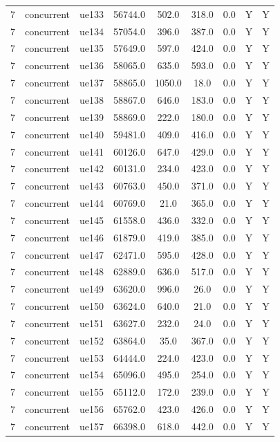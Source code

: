 \begin{table}[ht]
\begin{tabular}{|c|c|c|c|c|c|c|c|c|}
7 & concurrent & ue133 & 56744.0 & 502.0 & 318.0 & 0.0 & Y & Y \\
7 & concurrent & ue134 & 57054.0 & 396.0 & 387.0 & 0.0 & Y & Y \\
7 & concurrent & ue135 & 57649.0 & 597.0 & 424.0 & 0.0 & Y & Y \\
7 & concurrent & ue136 & 58065.0 & 635.0 & 593.0 & 0.0 & Y & Y \\
7 & concurrent & ue137 & 58865.0 & 1050.0 & 18.0 & 0.0 & Y & Y \\
7 & concurrent & ue138 & 58867.0 & 646.0 & 183.0 & 0.0 & Y & Y \\
7 & concurrent & ue139 & 58869.0 & 222.0 & 180.0 & 0.0 & Y & Y \\
7 & concurrent & ue140 & 59481.0 & 409.0 & 416.0 & 0.0 & Y & Y \\
7 & concurrent & ue141 & 60126.0 & 647.0 & 429.0 & 0.0 & Y & Y \\
7 & concurrent & ue142 & 60131.0 & 234.0 & 423.0 & 0.0 & Y & Y \\
7 & concurrent & ue143 & 60763.0 & 450.0 & 371.0 & 0.0 & Y & Y \\
7 & concurrent & ue144 & 60769.0 & 21.0 & 365.0 & 0.0 & Y & Y \\
7 & concurrent & ue145 & 61558.0 & 436.0 & 332.0 & 0.0 & Y & Y \\
7 & concurrent & ue146 & 61879.0 & 419.0 & 385.0 & 0.0 & Y & Y \\
7 & concurrent & ue147 & 62471.0 & 595.0 & 428.0 & 0.0 & Y & Y \\
7 & concurrent & ue148 & 62889.0 & 636.0 & 517.0 & 0.0 & Y & Y \\
7 & concurrent & ue149 & 63620.0 & 996.0 & 26.0 & 0.0 & Y & Y \\
7 & concurrent & ue150 & 63624.0 & 640.0 & 21.0 & 0.0 & Y & Y \\
7 & concurrent & ue151 & 63627.0 & 232.0 & 24.0 & 0.0 & Y & Y \\
7 & concurrent & ue152 & 63864.0 & 35.0 & 367.0 & 0.0 & Y & Y \\
7 & concurrent & ue153 & 64444.0 & 224.0 & 423.0 & 0.0 & Y & Y \\
7 & concurrent & ue154 & 65096.0 & 495.0 & 254.0 & 0.0 & Y & Y \\
7 & concurrent & ue155 & 65112.0 & 172.0 & 239.0 & 0.0 & Y & Y \\
7 & concurrent & ue156 & 65762.0 & 423.0 & 426.0 & 0.0 & Y & Y \\
7 & concurrent & ue157 & 66398.0 & 618.0 & 442.0 & 0.0 & Y & Y \\

\end{tabular}
\end{table}
